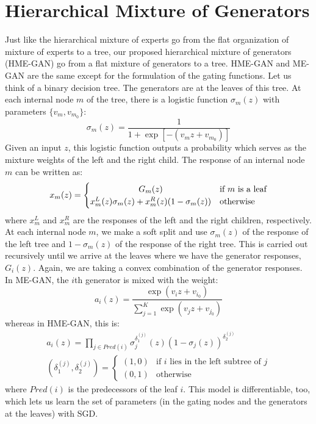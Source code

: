 \documentclass[a4paper,onesided,12pt]{report}
\begin{document}
\section{Hierarchical Mixture of Generators}
\label{sec:hmgan}
Just like the hierarchical mixture of experts \cite{jordan1994hierarchical} go from the flat organization of mixture of experts  \cite{jacobs1991adaptive} to a tree, our proposed hierarchical mixture of generators (HME-GAN) go from a flat mixture of generators to a tree. HME-GAN and ME-GAN are the same except for the formulation of the gating functions. Let us think of a binary decision tree. The generators are at the leaves of this tree. At each internal node $m$ of the tree, there is a logistic function $\sigma_m(z)$ with parameters $\{v_m, v_{m_0}\}$:
\begin{equation}
\sigma_m(z) = \frac{1}{1+\exp{[-(v_m z + v_{m_0})]}}
\label{eq:sigmoid}
\end{equation}
Given an input $z$, this logistic function outputs a probability which serves as the mixture weights of the left and the right child. The response of an internal node $m$ can be written as:
\begin{equation}
x_m(z)=
	\begin{cases}
		\hfil G_m(z) &\text{if $m$ is a leaf} \\
		\hfil x_m^{L}(z) \sigma_m(z) + x_m^{R}(z)(1 - \sigma_m(z)) &\text{otherwise}
	\end{cases}
\label{eq:hmgan2}
\end{equation}
where $x_m^L$ and $x_m^R$ are the responses of the left and the right children, respectively. At each internal node $m$, we make a soft split and use $\sigma_m(z)$ of the response of the left tree and $1-\sigma_m(z)$ of the response of the right tree. This is carried out recursively until we arrive at the leaves where we have the generator responses, $G_i(z)$. Again, we are taking a convex combination of the generator responses. In ME-GAN, the $i$th generator is mixed with the weight:
\begin{equation}
a_i(z) = \frac{\exp{(v_i z + v_{i_0})}}{\sum_{j=1}^K \exp{(v_j z + v_{j_0})}}
\label{eq:fm_mix}
\end{equation}
whereas in HME-GAN, this is:
\begin{gather}\label{eq:hm_mix}
a_i(z) = \prod_{j \in Pred(i)} \sigma_j^{\delta_1^{(j)}}(z) (1-\sigma_j(z))^{\delta_2^{(j)}}\\
(\delta_1^{(j)}, \delta_2^{(j)}) =
	\begin{cases}
		(1, 0) & \text{if $i$ lies in the left subtree of $j$} \\
		(0, 1) & \text{otherwise}	
	\end{cases}
\end{gather}
where $Pred(i)$ is the predecessors of the leaf $i$. This model is differentiable, too, which lets us learn the set of parameters (in the gating nodes and the generators at the leaves) with SGD.
\end{document}
